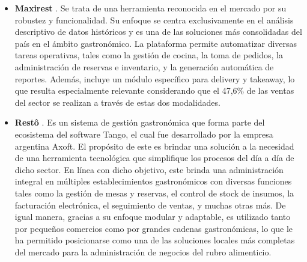 \begin{itemize}
    \item \textbf{Maxirest} \parencite{latam2024maxirest}. Se trata de una herramienta reconocida en el mercado por su robustez y funcionalidad. Su enfoque se centra exclusivamente en el análisis descriptivo de datos históricos y es una de las soluciones más consolidadas del país en el ámbito gastronómico. La plataforma permite automatizar diversas tareas operativas, tales como la gestión de cocina, la toma de pedidos, la administración de reservas e inventario, y la generación automática de reportes. Además, incluye un módulo específico para delivery y takeaway, lo que resulta especialmente relevante considerando que el 47,6\% de las ventas del sector se realizan a través de estas dos modalidades.
    
    \item \textbf{Restô} \parencite{iprofesional2014resto}. Es un sistema de gestión gastronómica que forma parte del ecosistema del software Tango, el cual fue desarrollado por la empresa argentina Axoft. El propósito de este es brindar una solución a la necesidad de una herramienta tecnológica que simplifique los procesos del día a día de dicho sector. En línea con dicho objetivo, este brinda una administración integral en múltiples establecimientos gastronómicos con diversas funciones tales como la gestión de mesas y reservas, el control de stock de insumos, la facturación electrónica, el seguimiento de ventas, y muchas otras más. De igual manera, gracias a su enfoque modular y adaptable, es utilizado tanto por pequeños comercios como por grandes cadenas gastronómicas, lo que le ha permitido posicionarse como una de las soluciones locales más completas del mercado para la administración de negocios del rubro alimenticio.
\end{itemize}

